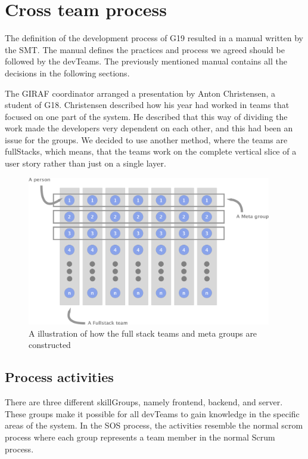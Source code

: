 \section{Cross team process}
The definition of the development process of \gls{G19} resulted in a manual\cite{processManual} written by the \gls{SMT}. The manual defines the practices and process we agreed should be followed by the \glspl{devTeam}. The previously mentioned manual contains all the decisions in the following sections.

The GIRAF coordinator arranged a presentation by Anton Christensen, a student of \gls{G18}. Christensen described how his year had worked in teams that focused on one part of the system. He described that this way of dividing the work made the developers very dependent on each other, and this had been an issue for the groups. We decided to use another method, where the teams are \Glspl{fullStack}, which means, that the teams work on the complete vertical slice of a user story rather than just on a single layer.
\begin{figure}[H]
        \begin{center}
            \includegraphics[width=0.95\textwidth]{figures/MetaGroupsFigure.pdf}
        \end{center}
        \caption{A illustration of how the full stack teams and meta groups are constructed}
        \label{fig:MetaGroupsFigure}
\end{figure}
\subsection{Process activities}
There are three different \glspl{skillGroup}, namely frontend, backend, and server. These groups make it possible for all \glspl{devTeam} to gain knowledge in the specific areas of the system. In the \gls{SOS} process, the activities resemble the normal scrom process where each group represents a team member in the normal Scrum process.

